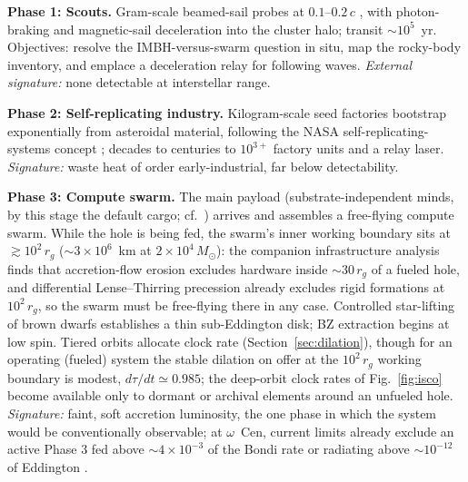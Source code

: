 \documentclass[11pt]{article}
\newcommand{\msun}{\ensuremath{M_\odot}}
\begin{document}
\textbf{Phase 1: Scouts.} Gram-scale beamed-sail probes at $0.1$--$0.2\,c$ \citep{Lubin2016}, with photon-braking and magnetic-sail deceleration into the cluster halo; transit $\sim$$10^{5}$~yr. Objectives: resolve the IMBH-versus-swarm question in situ, map the rocky-body inventory, and emplace a deceleration relay for following waves. \emph{External signature:} none detectable at interstellar range.

\textbf{Phase 2: Self-replicating industry.} Kilogram-scale seed factories bootstrap exponentially from asteroidal material, following the NASA self-replicating-systems concept \citep{Freitas1982}; decades to centuries to $10^{3+}$ factory units and a relay laser. \emph{Signature:} waste heat of order early-industrial, far below detectability.

\textbf{Phase 3: Compute swarm.} The main payload (substrate-independent minds, by this stage the default cargo; cf.\ \citealt{Smart2012}) arrives and assembles a free-flying compute swarm. While the hole is being fed, the swarm's inner working boundary sits at $\gtrsim 10^{2}\,r_g$ ($\sim$$3\times10^{6}$~km at $2\times10^{4}\,\msun$): the companion infrastructure analysis \citep{Swanson2026Engineered} finds that accretion-flow erosion excludes hardware inside $\sim$$30\,r_g$ of a fueled hole, and differential Lense--Thirring precession already excludes rigid formations at $10^{2}\,r_g$, so the swarm must be free-flying there in any case. Controlled star-lifting of brown dwarfs establishes a thin sub-Eddington disk; BZ extraction begins at low spin. Tiered orbits allocate clock rate (Section~\ref{sec:dilation}), though for an operating (fueled) system the stable dilation on offer at the $10^{2}\,r_g$ working boundary is modest, $d\tau/dt \simeq 0.985$; the deep-orbit clock rates of Fig.~\ref{fig:isco} become available only to dormant or archival elements around an unfueled hole. \emph{Signature:} faint, soft accretion luminosity, the one phase in which the system would be conventionally observable; at $\omega$~Cen, current limits already exclude an active Phase 3 fed above $\sim 4\times10^{-3}$ of the Bondi rate \citep{Mahida2026} or radiating above $\sim 10^{-12}$ of Eddington \citep{Haggard2013,Chen2025JWST}.
\end{document}
